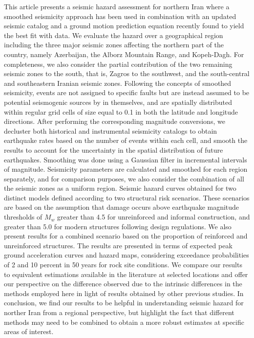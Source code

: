 % 
This article presents a seismic hazard assessment for northern Iran where a smoothed seismicity approach has been used in combination with an updated seismic catalog and a ground motion prediction equation recently found to yield the best fit with data. We evaluate the hazard over a geographical region including the three major seismic zones affecting the northern part of the country, namely Azerbaijan, the Alborz Mountain Range, and Kopeh-Dagh. For completeness, we also consider the partial contribution of the two remaining seismic zones to the south, that is, Zagros to the southwest, and the south-central and southeastern Iranian seismic zones. Following the concepts of smoothed seismicity, events are not assigned to specific faults but are instead assumed to be potential seismogenic sources by in themselves, and are spatially distributed within regular grid cells of size equal to 0.1\textdegree{} in both the latitude and longitude directions. After performing the corresponding magnitude conversions, we decluster both historical and instrumental seismicity catalogs to obtain earthquake rates based on the number of events within each cell, and smooth the results to account for the uncertainty in the spatial distribution of future earthquakes. Smoothing was done using a Gaussian filter in incremental intervals of magnitude. Seismicity parameters are calculated and smoothed for each region separately, and for comparison purposes, we also consider the combination of all the seismic zones as a uniform region. Seismic hazard curves obtained for two distinct models defined according to two structural risk scenarios. These scenarios are based on the assumption that damage occurs above earthquake magnitude thresholds of $M_w$ greater than 4.5 for unreinforced and informal construction, and greater than 5.0 for modern structures following design regulations. We also present results for a combined scenario based on the proportion of reinforced and unreinforced structures. The results are presented in terms of expected peak ground acceleration curves and hazard maps, considering exceedance probabilities of 2 and 10 percent in 50 years for rock site conditions. We compare our results to equivalent estimations available in the literature at selected locations and offer our perspective on the difference observed due to the intrinsic differences in the methods employed here in light of results obtained by other previous studies. In conclusion, we find our results to be helpful in understanding seismic hazard for norther Iran from a regional perspective, but highlight the fact that different methods may need to be combined to obtain a more robust estimates at specific areas of interest.


